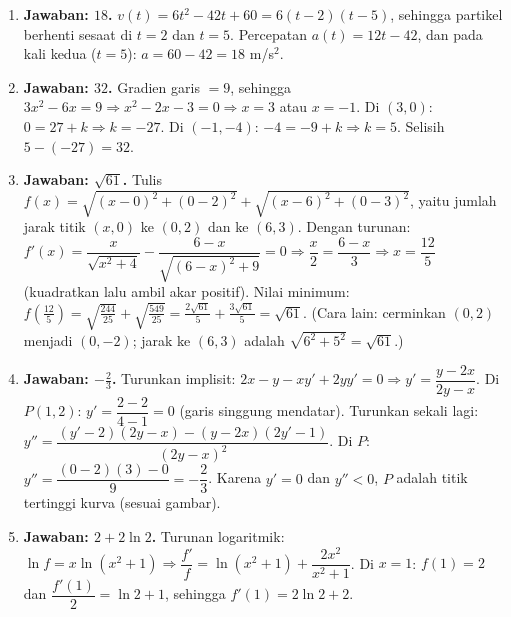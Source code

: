 \documentclass[a4paper,11pt]{article}
\newcounter{no}
\begin{document}
\small\begin{enumerate}[leftmargin=2em,itemsep=2pt,topsep=2pt]
\item[\textbf{1.}] \textbf{Jawaban: $18$.} $v(t)=6t^2-42t+60=6(t-2)(t-5)$, sehingga partikel berhenti sesaat di $t=2$ dan $t=5$. Percepatan $a(t)=12t-42$, dan pada kali kedua ($t=5$): $a=60-42=18$ m/s$^2$.
\item[\textbf{2.}] \textbf{Jawaban: $32$.} Gradien garis $=9$, sehingga $3x^2-6x=9\Rightarrow x^2-2x-3=0\Rightarrow x=3$ atau $x=-1$. Di $(3,0)$: $0=27+k\Rightarrow k=-27$. Di $(-1,-4)$: $-4=-9+k\Rightarrow k=5$. Selisih $5-(-27)=32$.
\item[\textbf{3.}] \textbf{Jawaban: $\sqrt{61}$.} Tulis $f(x)=\sqrt{(x-0)^2+(0-2)^2}+\sqrt{(x-6)^2+(0-3)^2}$, yaitu jumlah jarak titik $(x,0)$ ke $(0,2)$ dan ke $(6,3)$. Dengan turunan: $f'(x)=\dfrac{x}{\sqrt{x^2+4}}-\dfrac{6-x}{\sqrt{(6-x)^2+9}}=0\Rightarrow\dfrac x2=\dfrac{6-x}3\Rightarrow x=\dfrac{12}5$ (kuadratkan lalu ambil akar positif). Nilai minimum: $f\!\left(\frac{12}5\right)=\sqrt{\frac{244}{25}}+\sqrt{\frac{549}{25}}=\frac{2\sqrt{61}}5+\frac{3\sqrt{61}}5=\sqrt{61}$. (Cara lain: cerminkan $(0,2)$ menjadi $(0,-2)$; jarak ke $(6,3)$ adalah $\sqrt{6^2+5^2}=\sqrt{61}$.)
\item[\textbf{4.}] \textbf{Jawaban: $-\frac23$.} Turunkan implisit: $2x-y-xy'+2yy'=0\Rightarrow y'=\dfrac{y-2x}{2y-x}$. Di $P(1,2)$: $y'=\dfrac{2-2}{4-1}=0$ (garis singgung mendatar). Turunkan sekali lagi: $y''=\dfrac{(y'-2)(2y-x)-(y-2x)(2y'-1)}{(2y-x)^2}$. Di $P$: $y''=\dfrac{(0-2)(3)-0}{9}=-\dfrac23$. Karena $y'=0$ dan $y''<0$, $P$ adalah titik tertinggi kurva (sesuai gambar).
\item[\textbf{5.}] \textbf{Jawaban: $2+2\ln2$.} Turunan logaritmik: $\ln f=x\ln(x^2+1)\Rightarrow\dfrac{f'}f=\ln(x^2+1)+\dfrac{2x^2}{x^2+1}$. Di $x=1$: $f(1)=2$ dan $\dfrac{f'(1)}{2}=\ln2+1$, sehingga $f'(1)=2\ln2+2$.
\end{enumerate}
\par{}\par\vspace{0.2em}
\end{document}
